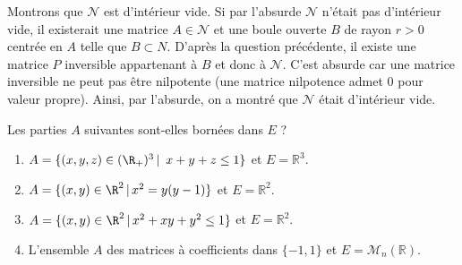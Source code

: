 \documentclass[a4paper,10pt]{report}
\begin{document}
\begin{enumerate}
\begin{enumerate}
\medskip

\noindent Montrons que $\mathcal{N}$ est d'intérieur vide. Si par l'absurde $\mathcal{N}$ n'était pas d'intérieur vide, il existerait une matrice $A \in \mathcal{N}$ et une boule ouverte $B$ de rayon $r>0$ centrée en $A$ telle que $B \subset N$. D'après la question précédente, il existe une matrice $P$ inversible appartenant à $B$ et donc à $\mathcal{N}$. C'est absurde car une matrice inversible ne peut pas être nilpotente (une matrice nilpotence admet $0$ pour valeur propre). Ainsi, par l'absurde, on a montré que $\mathcal{N}$ était d'intérieur vide.
\end{enumerate}
\end{enumerate}

\begin{Exa} Les parties $A$ suivantes sont-elles bornées dans $E$ ?

\begin{enumerate}
\item $A= \lbrace (x,y,z)\in (\R_+)^3 \, \vert \,  \ x+y+z\leq 1\rbrace$ et $E= \mathbb{R}^3$.
\item $A = \lbrace (x,y)\in\R^2 \, \vert \, x^2=y(y-1) \rbrace$ et $E= \mathbb{R}^2$.
\item $A = \lbrace (x,y)\in\R^2 \, \vert \, x^2+xy+y^2\leq1 \rbrace$ et $E= \mathbb{R}^2$.
\item L'ensemble $A$ des matrices à coefficients dans $\lbrace -1,1 \rbrace$ et $E = \mathcal{M}_n(\mathbb{R})$.
\end{enumerate}
\end{Exa}
\end{document}
